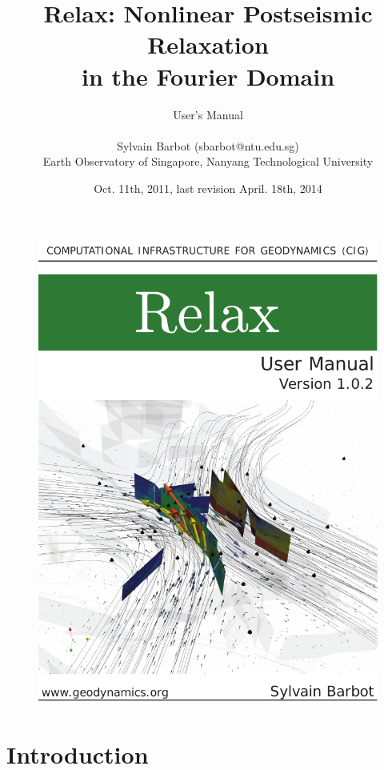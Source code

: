 \documentclass[10pt]{article}
\title{\bf Relax: Nonlinear Postseismic Relaxation\\in the Fourier Domain}
\author
{User's Manual\\
\\
\normalsize{Sylvain Barbot (sbarbot@ntu.edu.sg)}\\
\normalsize{Earth Observatory of Singapore, Nanyang Technological University}\\
}
\date{Oct. 11th, 2011, last revision April. 18th, 2014}
\begin{document}
 


\thispagestyle{empty}
\begin{figure}[!h]
\centering\includegraphics[width=15.092cm]{cover.pdf}
\end{figure}
\pagebreak

\maketitle 


\vspace{1cm}


\pagestyle{fancy}
\cfoot{\thepage}

\section{Introduction}
\end{document}
